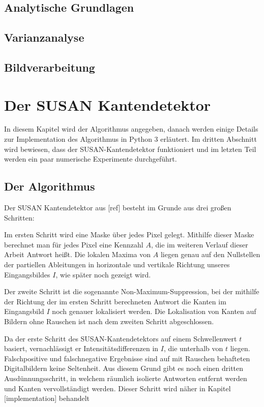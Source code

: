 \documentclass[a4paper, 11pt]{report}
\theoremstyle{definition}
\begin{document}
	\section{Analytische Grundlagen}
	\section{Varianzanalyse}
	\section{Bildverarbeitung}

\chapter{Der SUSAN Kantendetektor}
	In diesem Kapitel wird der Algorithmus angegeben, danach werden einige Details zur Implementation des Algorithmus in Python 3 erläutert. Im dritten Abschnitt wird bewiesen, dass der SUSAN-Kantendetektor funktioniert und im letzten Teil werden ein paar numerische Experimente durchgeführt.

	\section{Der Algorithmus}\label{sec:thealgorithm}
		Der SUSAN Kantendetektor aus [ref] besteht im Grunde aus drei großen Schritten:

		Im ersten Schritt wird eine Maske über jedes Pixel gelegt. Mithilfe dieser Maske berechnet man für jedes Pixel eine Kennzahl $A$, die im weiteren Verlauf dieser Arbeit \glqq Antwort\grqq{} heißt. Die lokalen Maxima von $A$ liegen genau auf den Nullstellen der partiellen Ableitungen in horizontale und vertikale Richtung unseres Eingangsbildes $I$, wie später noch gezeigt wird.

		Der zweite Schritt ist die sogenannte Non-Maximum-Suppression, bei der mithilfe der Richtung der im ersten Schritt berechneten Antwort die Kanten im Eingangsbild $I$ noch genauer lokalisiert werden. Die Lokalisation von Kanten auf Bildern ohne Rauschen ist nach dem zweiten Schritt abgeschlossen.

		Da der erste Schritt des SUSAN-Kantendetektors auf einem Schwellenwert $t$ basiert, vernachlässigt er Intensitätsdifferenzen in $I$, die unterhalb von $t$ liegen. Falschpositive und falschnegative Ergebnisse sind auf mit Rauschen behafteten Digitalbildern keine Seltenheit. Aus diesem Grund gibt es noch einen dritten Ausdünnungsschritt, in welchem räumlich isolierte Antworten entfernt werden und Kanten vervollständigt werden. Dieser Schritt wird näher in Kapitel [implementation] behandelt
\end{document}
